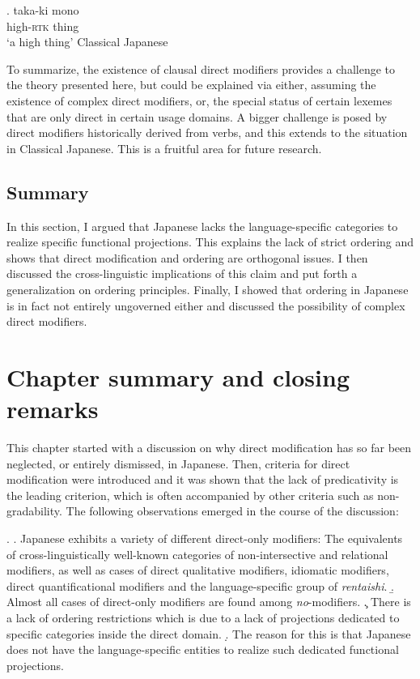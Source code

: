 \documentclass [output=book,colorlinks,citecolor=brown]{langscibook}
\begin{document}
\exg. taka-ki mono\\
high-\textsc{rtk} thing\\
`a high thing' \null \hfill Classical Japanese

To summarize, the existence of clausal direct modifiers provides a challenge to the theory presented here, but could be explained via either, assuming the existence of complex direct modifiers, or, the special status of certain lexemes that are only direct in certain usage domains. A bigger challenge is posed by direct modifiers historically derived from verbs, and this extends to the situation in Classical Japanese. This is a fruitful area for future research.

\subsection{Summary}

In this section, I argued that Japanese lacks the language-specific categories to realize specific functional projections. This explains the lack of strict ordering and shows that direct modification and ordering are orthogonal issues. I then discussed the cross-linguistic implications of this claim and put forth a generalization on ordering principles. Finally, I showed that ordering in Japanese is in fact not entirely ungoverned either and discussed the possibility of complex direct modifiers.

\section{Chapter summary and closing remarks}

This chapter started with a discussion on why direct modification has so far been neglected, or entirely dismissed, in Japanese. Then, criteria for direct modification were introduced and it was shown that the lack of predicativity is the leading criterion, which is often accompanied by other criteria such as non-gradability. The following observations emerged in the course of the discussion:

\ex. \a. Japanese exhibits a variety of different direct-only modifiers: The equivalents of cross-linguistically well-known categories of non-intersective and relational modifiers, as well as cases of direct qualitative modifiers, idiomatic modifiers, direct quantificational modifiers and the language-specific group of \textit{rentaishi}.
\b. Almost all cases of direct-only modifiers are found among \textit{no}-modifiers.
\c. There is a lack of ordering restrictions which is due to a lack of projections dedicated to specific categories inside the direct domain.
\d. The reason for this is that Japanese does not have the language-specific entities to realize such dedicated functional projections.
\end{document}
